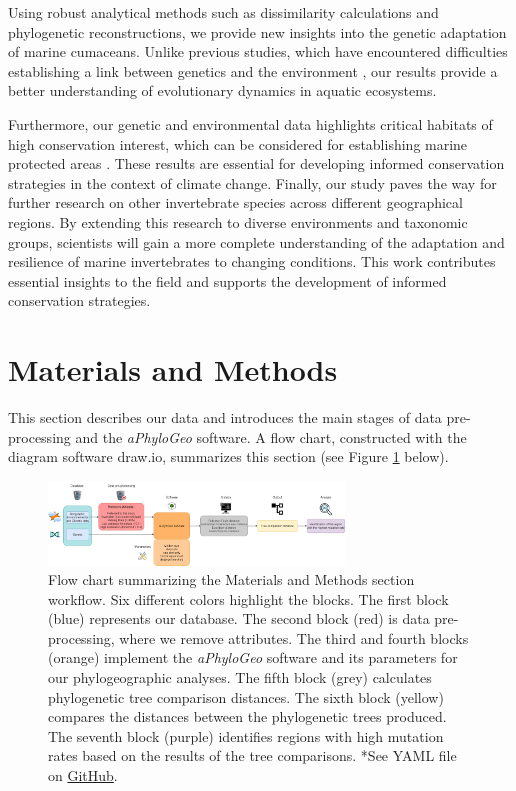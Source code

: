 Using robust analytical methods such as dissimilarity calculations and phylogenetic reconstructions, we provide new insights into the genetic adaptation of marine cumaceans. Unlike previous studies, which have encountered difficulties establishing a link between genetics and the environment \citep{manel2003landscape, balkenhol2009statistical}, our results provide a better understanding of evolutionary dynamics in aquatic ecosystems.

Furthermore, our genetic and environmental data highlights critical habitats of high conservation interest, which can be considered for establishing marine protected areas \citep{levin2009ecological}. These results are essential for developing informed conservation strategies in the context of climate change. Finally, our study paves the way for further research on other invertebrate species across different geographical regions. By extending this research to diverse environments and taxonomic groups, scientists will gain a more complete understanding of the adaptation and resilience of marine invertebrates to changing conditions. This work contributes essential insights to the field and supports the development of informed conservation strategies.

\section{Materials and Methods}\label{materials-methods}
This section describes our data and introduces the main stages of data pre-processing and the \textit{aPhyloGeo} software. A flow chart, constructed with the diagram software draw.io, summarizes this section (see Figure \ref{fig:fig1} below).

\begin{figure}[htbp]
    \centering
    \includegraphics[width=0.7\textwidth]{diagram.drawio.png}
    \caption{Flow chart summarizing the Materials and Methods section workflow. Six different colors highlight the blocks. The first block (blue) represents our database. The second block (red) is data pre-processing, where we remove attributes. The third and fourth blocks (orange) implement the \textit{aPhyloGeo} software and its parameters for our phylogeographic analyses. The fifth block (grey) calculates phylogenetic tree comparison distances. The sixth block (yellow) compares the distances between the phylogenetic trees produced. The seventh block (purple) identifies regions with high mutation rates based on the results of the tree comparisons. *See YAML file on \href{https://github.com/tahiri-lab/aPhyloGeo}{GitHub}. \label{fig:fig1}}
\end{figure}

